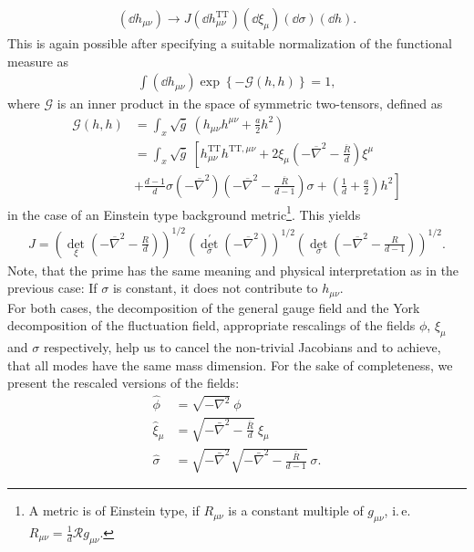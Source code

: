 \begin{align}
	\left(\dd h_{\mu\nu}\right) \longrightarrow J	\left(\dd h_{\mu\nu}^{\mathrm{TT}}\right) \left(\dd\xi_{\mu}\right)\left(\dd\sigma\right)\left(\dd h\right).
\end{align}
This is again possible after specifying a suitable normalization of the functional measure as
\begin{align}
	\int (\dd h_{\mu\nu}) \exp\left\{-\mathcal{G}(h, h)\right\} = 1,
\end{align}
where $\mathcal{G}$ is an inner product in the space of symmetric two-tensors, defined as
\begin{equation}
\begin{aligned} 
\mathcal{G}(h, h)&= \int_x \sqrt{\bar{g}} \ \left(h_{\mu \nu} h^{\mu \nu}+\frac{a}{2} h^{2}\right) \\[10pt]
&= \int_x \sqrt{\bar{g}} \ \left[h^{\mathrm{TT}}_{\mu \nu} h^{\mathrm{TT}, \mu \nu}+2 \xi_{\mu}\left(-\overline{\nabla}^{2}-\frac{\overline{R}}{d}\right) \xi^{\mu}\right. \\
&+\left.\frac{d-1}{d} \sigma\left(-\overline{\nabla}^{2}\right)\left(-\overline{\nabla}^{2}-\frac{\overline{R}}{d-1}\right) \sigma+\left(\frac{1}{d}+\frac{a}{2}\right) h^{2} \right] 
\end{aligned}
\end{equation}
in the case of an Einstein type background metric\footnote{A metric is of Einstein type, if $R_{\mu\nu}$ is a constant multiple of $g_{\mu\nu}$, i.\,e. $R_{\mu\nu} = \frac{1}{d} \mathcal{R} g_{\mu\nu}$.}. This yields
\begin{align}
	J=\left(\operatorname{det}_{\xi}\left(-\overline{\nabla}^{2}-\frac{R}{d}\right)\right)^{1 / 2}\left(\operatorname{det}_{\sigma}^{\prime}\left(-\overline{\nabla}^{2}\right)\right)^{1 / 2}\left(\operatorname{det}_{\sigma}\left(-\overline{\nabla}^{2}-\frac{R}{d-1}\right)\right)^{1 / 2}.
\end{align}
Note, that the prime has the same meaning and physical interpretation as in the previous case: If $\sigma$ is constant, it does not contribute to $h_{\mu\nu}$. \\
 For both cases, the decomposition of the general gauge field and the York decomposition of the fluctuation field, appropriate rescalings of the fields $\phi$, $\xi_{\mu}$ and $\sigma$ respectively, help us to cancel the non-trivial Jacobians and to achieve, that all modes have the same mass dimension. For the sake of completeness, we present the rescaled versions of the fields:
 \begin{align}
\hat{\phi} &= \sqrt{-\nabla^2}\ \phi \\[10pt]
 \hat{\xi}_{\mu} &= \sqrt{-\bar{\nabla}^{2}-\frac{\bar{R}}{d}}\  \xi_{\mu} \\[10pt]
  \hat{\sigma} &= \sqrt{-\bar{\nabla}^{2}} \sqrt{-\bar{\nabla}^{2}-\frac{\bar{R}}{d-1}}\ \sigma. 
 \end{align}

